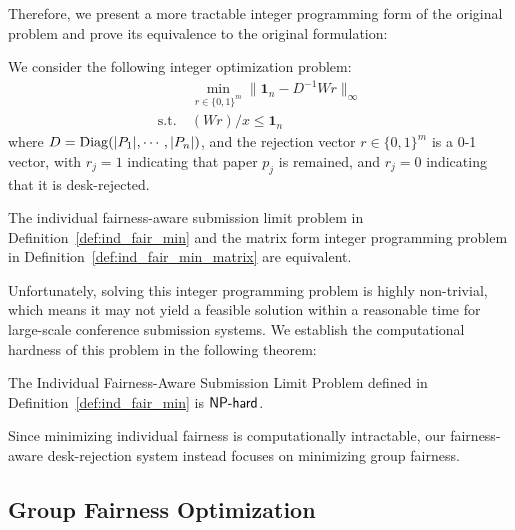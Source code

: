 Therefore, we present a more tractable integer
programming form of the original problem and prove its equivalence to the original
formulation:

\begin{definition}\label{def:ind_fair_min_matrix}
    We consider the following integer optimization problem:
    \begin{align*}
        & ~ \min_{r \in \{0,1\}^m} \| \mathbf{1}_n - D^{-1}Wr\|_\infty \\
    \mathrm{s.t.} & ~ 
     (W r) / x \leq \mathbf{1}_n
    \end{align*}
    where $D = \operatorname{Diag}(|P_1|, \cdots, |P_n|)$, and the rejection vector $r \in \{0, 1\}^m$ is a 0-1 vector, with $r_j = 1$ indicating that paper $p_j$ is remained, and $r_j = 0$ indicating that it is desk-rejected. 
\end{definition}

\begin{proposition}\label{prop:equiv_individual}
    The individual fairness-aware submission limit problem in Definition~\ref{def:ind_fair_min} and the matrix form integer programming problem in Definition~\ref{def:ind_fair_min_matrix} are equivalent.
\end{proposition}

Unfortunately, solving this integer programming problem is highly non-trivial, which means it may not yield a feasible solution within a reasonable time for large-scale conference submission systems. We establish the computational hardness of this problem in the following theorem:
 
\begin{theorem}\label{thm:indi_nphard}
    The Individual Fairness-Aware Submission Limit Problem defined in Definition~\ref{def:ind_fair_min} is $\mathsf{NP}\text{-}\mathsf{hard}$.
\end{theorem}

Since minimizing individual fairness is computationally intractable, our fairness-aware desk-rejection system instead focuses on minimizing group fairness. 


\subsection{Group Fairness Optimization}\label{sec:fair_optim}

